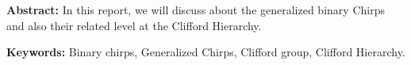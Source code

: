 


\begin{flushleft}
	{\bf{Abstract:}}
	In this report, we will discuss about the generalized binary Chirps and also their related level at the Clifford Hierarchy.
\end{flushleft}
\begin{flushleft}
	{\bf{Keywords:}} 	Binary chirps, Generalized Chirps, Clifford group, Clifford Hierarchy.
\end{flushleft}